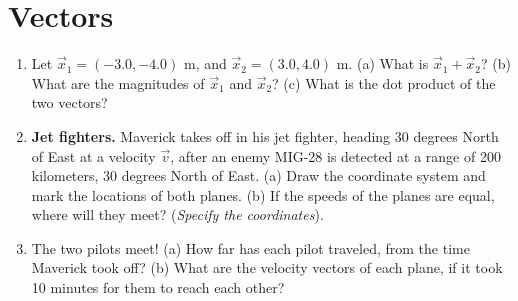 \documentclass[10pt]{article}
\begin{document}
\section{Vectors}
\begin{enumerate}
\item Let $\vec{x}_1 = (-3.0,-4.0)$ m, and $\vec{x}_2 = (3.0,4.0)$ m.  (a) What is $\vec{x}_1 + \vec{x}_2$? (b) What are the magnitudes of $\vec{x}_1$ and $\vec{x}_2$? (c) What is the dot product of the two vectors? \\ \vspace{2cm}
\item \textbf{Jet fighters.}  Maverick takes off in his jet fighter, heading 30 degrees North of East at a velocity $\vec{v}$, after an enemy MIG-28 is detected at a range of 200 kilometers, 30 degrees North of East.  (a) Draw the coordinate system and mark the locations of both planes.   (b) If the speeds of the planes are equal, where will they meet? (\textit{Specify the coordinates}). \\ \vspace{3.5cm}
\item The two pilots meet!  (a) How far has each pilot traveled, from the time Maverick took off?  (b) What are the velocity vectors of each plane, if it took 10 minutes for them to reach each other?
\end{enumerate}
\end{document}

